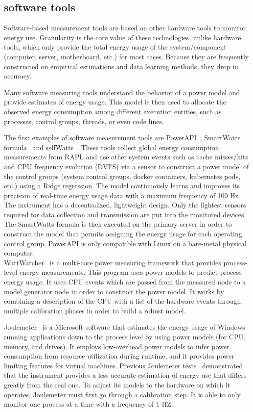 \subsection{software tools}

Software-based measurement tools are based on other hardware tools to monitor energy use. Granularity is the core value of these technologies, unlike hardware tools, which only provide the total energy usage of the system/component (computer, server, motherboard, etc.) for most cases. Because they are frequently constructed on empirical estimations and data learning methods, they drop in accuracy.

Many software measuring tools understand the behavior of a power model and provide estimates of energy usage. This model is then used to allocate the observed energy consumption among different execution entities, such as processes, control groups, threads, or even code lines.

The first examples of software measurement tools are PowerAPI~\cite{colmant2018next}, SmartWatts formula~\cite{fieni2020smartwatts} and selfWatts~\cite{fieni2021selfwatts}.
These tools collect global energy consumption measurements from RAPL and use other system events such as cache misses/hits and CPU frequency evolution (DVFS) via a sensor to construct a power model of the control groups (system control groups, docker containers, kubernetes pods, etc.) using a Ridge regression.
The model continuously learns and improves its precision of real-time energy usage data with a maximum frequency of 100 Hz.
The instrument has a decentralized, lightweight design.
Only the lightest sensors required for data collection and transmission are put into the monitored devices.
The SmartWatts formula is then executed on the primary server in order to construct the model that permits assigning the energy usage for each operating control group.
PowerAPI is only compatible with Linux on a bare-metal physical computer.
\\
WattWatcher~\cite{lebeane2015watt} is a multi-core power measuring framework that provides process-level energy measurements.
This program uses power models to predict process energy usage. It uses CPU events which are passed from the measured node to a model generator node in order to construct the power model. It works by combining a description of the CPU with a list of the hardware events through multiple calibration phases in order to build a robust model.


Joulemeter~\cite{kothari2009joulemeter,jagroep2017energy} is a Microsoft software that estimates the energy usage of Windows running applications down to the process level by using power models (for CPU, memory, and drives).
It employs low-overhead power models to infer power consumption from resource utilization during runtime, and it provides power limiting features for virtual machines.
Previous Joulemeter tests~\cite{jagroep2015profiling} demonstrated that the instrument provides a less accurate estimation of energy use that differs greatly from the real one.
To adjust its models to the hardware on which it operates, Joulemeter must first go through a calibration step.
It is able to only monitor one process at a time with a frequency of 1 HZ.



